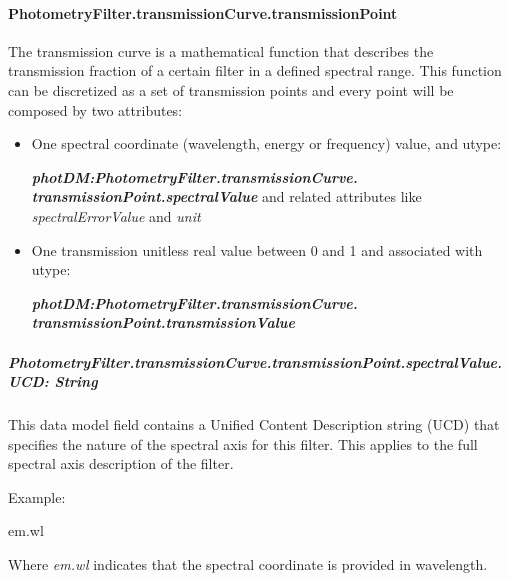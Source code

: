 \documentclass[11pt,a4paper]{ivoa}
\begin{document}
\paragraph{PhotometryFilter.transmissionCurve.transmissionPoint} 
The transmission curve is a mathematical function that describes the transmission 
fraction of a certain filter in a defined spectral range. This function can be discretized 
as a set of transmission points and every point will be composed by two attributes:
\par

\begin{itemize}
	\item One spectral coordinate (wavelength, energy or frequency) value, and utype:\par

\begin{center}
{\fontsize{10pt}{12.0pt}\selectfont 
\textbf{\textit{photDM:PhotometryFilter.transmissionCurve.
transmissionPoint.spectralValue}}
and related attributes like \textit{spectralErrorValue} and \textit{unit} }
\end{center}\par

	\item One transmission unitless real value between 0 and 1 and associated with
	utype:\par
\begin{center}
{\fontsize{10pt}{12.0pt}\selectfont \textbf{\textit{photDM:PhotometryFilter.transmissionCurve.
transmissionPoint.transmissionValue}}}
\end{center}\par

\end{itemize}\par
\subparagraph{PhotometryFilter.transmissionCurve.transmissionPoint.spectralValue.UCD: String}
This data model field contains a Unified Content Description string (UCD) 
\citep{2018ivoa.spec.0527P} that specifies the nature of the spectral axis for this filter. 
This applies to the full spectral axis description of the filter.
\par

Example:
\par

em.wl

Where \textit{em.wl }indicates that the spectral coordinate is provided in wavelength.
\par
\end{document}
